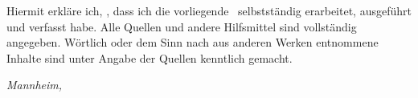 
\makeatletter

Hiermit erkläre ich, \@author, dass ich die vorliegende \@subject\ selbstständig erarbeitet, ausgeführt und verfasst habe. Alle Quellen und andere Hilfsmittel sind vollständig angegeben. Wörtlich oder dem Sinn nach aus anderen Werken entnommene Inhalte sind unter Angabe der Quellen kenntlich gemacht.

\par\medskip

\noindent
\emph{Mannheim, \@date}

\par\bigskip

\begin{flushright}
\begin{minipage}{5cm}
	\centering
	\hrulefill
	\par\@author
\end{minipage}
\end{flushright}

\makeatother